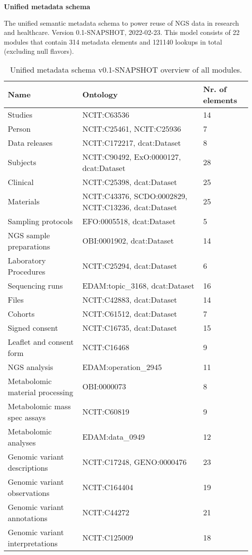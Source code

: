 \documentclass{article}
\begin{document}
\setlength\parindent{0pt}

\textbf{Unified metadata schema}
\newline

The unified semantic metadata schema to power reuse of NGS data in research and healthcare. Version 0.1-SNAPSHOT, 2022-02-23. This model consists of 22 modules that contain 314 metadata elements and 121140 lookups in total (excluding null flavors).

\begin{table}[htb]
\begin{tabular}{lll}
Name & Ontology & Nr. of elements \\
\hline
Studies & NCIT:C63536  & 14 \\
Person & NCIT:C25461, NCIT:C25936  & 7 \\
Data releases & NCIT:C172217, dcat:Dataset  & 8 \\
Subjects & NCIT:C90492, ExO:0000127, dcat:Dataset  & 28 \\
Clinical & NCIT:C25398, dcat:Dataset  & 25 \\
Materials & NCIT:C43376, SCDO:0002829, NCIT:C13236, dcat:Dataset  & 25 \\
Sampling protocols & EFO:0005518, dcat:Dataset  & 5 \\
NGS sample preparations & OBI:0001902, dcat:Dataset  & 14 \\
Laboratory Procedures & NCIT:C25294, dcat:Dataset  & 6 \\
Sequencing runs & EDAM:topic\_3168, dcat:Dataset  & 16 \\
Files & NCIT:C42883, dcat:Dataset  & 14 \\
Cohorts & NCIT:C61512, dcat:Dataset  & 7 \\
Signed consent & NCIT:C16735, dcat:Dataset  & 15 \\
Leaflet and consent form & NCIT:C16468  & 9 \\
NGS analysis & EDAM:operation\_2945  & 11 \\
Metabolomic material processing & OBI:0000073  & 8 \\
Metabolomic mass spec assays & NCIT:C60819  & 9 \\
Metabolomic analyses & EDAM:data\_0949  & 12 \\
Genomic variant descriptions & NCIT:C17248, GENO:0000476  & 23 \\
Genomic variant observations & NCIT:C164404  & 19 \\
Genomic variant annotations & NCIT:C44272  & 21 \\
Genomic variant interpretations & NCIT:C125009  & 18 \\
\hline
\end{tabular}
\caption[Module overview]{\label{table:table1} Unified metadata schema v0.1-SNAPSHOT overview of all modules.}
\end{table}
\end{document}
